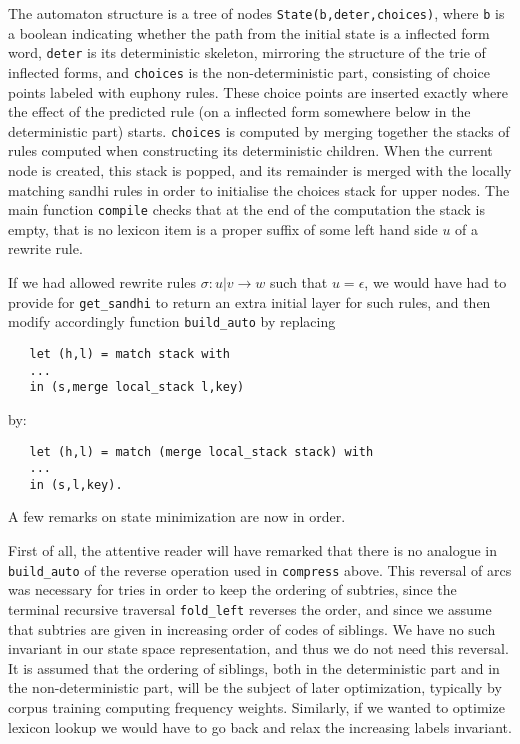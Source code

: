 The automaton structure is a tree of nodes \verb:State(b,deter,choices):,
where \verb:b: is a boolean indicating whether the path from the
initial state is a inflected form word, \verb:deter: is its deterministic 
skeleton, mirroring the structure of the trie of inflected forms, 
and \verb:choices:
is the non-deterministic part, consisting of choice points labeled with
euphony rules. 
These choice points are inserted exactly where the effect of
the predicted rule 
(on a inflected form somewhere below in the deterministic part) starts.
\verb:choices: is computed by merging together the stacks of rules computed 
when constructing its deterministic children. When the current node is created,
this stack is popped, and its remainder is merged with 
the locally matching sandhi rules in order to initialise the choices stack
for upper nodes. The main function \verb:compile: checks that at the end
of the computation the stack is empty, that is no lexicon item is a proper
suffix of some left hand side $u$ of a rewrite rule.

If we had allowed rewrite rules $\sigma:u|v\rightarrow w$ 
such that $u=\epsilon$, we would have had to provide for 
\verb:get_sandhi: to return an extra initial layer
for such rules, and then modify accordingly function 
\verb:build_auto: by replacing

\begin{verbatim}
   let (h,l) = match stack with
   ...
   in (s,merge local_stack l,key)
\end{verbatim}
by:
\begin{verbatim}
   let (h,l) = match (merge local_stack stack) with
   ...
   in (s,l,key).
\end{verbatim}

A few remarks on state minimization are now in order.

First of all, the attentive reader will have remarked that there is no
analogue in \verb:build_auto:
of the reverse operation used in \verb:compress: above. 
This reversal of arcs was necessary for tries in order to keep the
ordering of subtries, since the terminal recursive traversal \verb:fold_left:
reverses the order, and since we assume that subtries are given in increasing
order of codes of siblings. 
We have no such invariant in our state space representation, and thus we 
do not need this reversal. It is assumed that the ordering of siblings, both
in the deterministic part and in the non-deterministic part, will be the
subject of later optimization, typically by corpus training computing
frequency weights. Similarly, if we wanted to optimize lexicon lookup
we would have to go back and relax the increasing labels invariant.


